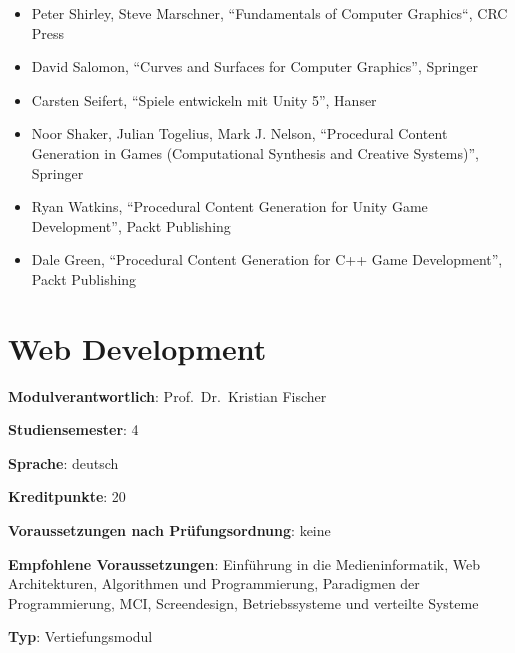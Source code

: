 \begin{itemize}
\tightlist
\item
  Peter Shirley, Steve Marschner, ``Fundamentals of Computer Graphics``,
  CRC Press
\item
  David Salomon, ``Curves and Surfaces for Computer Graphics'', Springer
\item
  Carsten Seifert, ``Spiele entwickeln mit Unity 5'', Hanser
\item
  Noor Shaker, Julian Togelius, Mark J. Nelson, ``Procedural Content
  Generation in Games (Computational Synthesis and Creative Systems)'',
  Springer
\item
  Ryan Watkins, ``Procedural Content Generation for Unity Game
  Development'', Packt Publishing
\item
  Dale Green, ``Procedural Content Generation for C++ Game
  Development'', Packt Publishing
\end{itemize}

\chapter{Web
Development\label{/mi-2017/modulbeschreibungen-bachelor/BA_Vertiefung-Web_Development}}\label{web-developmentpathlabelmi-2017modulbeschreibungen-bachelorbaux5fvertiefung-webux5fdevelopment}

\begin{modulHead}
\textbf{Modulverantwortlich}: Prof.~Dr.~Kristian
Fischer
\end{modulHead}
\begin{modulHead}
\textbf{Studiensemester}:
4
\end{modulHead}
\begin{modulHead}
\textbf{Sprache}:
deutsch
\end{modulHead}
\begin{modulHead}
\textbf{Kreditpunkte}:
20
\end{modulHead}
\begin{modulHead}
\textbf{Voraussetzungen nach
Prüfungsordnung}:
keine
\end{modulHead}
\begin{modulHead}
\textbf{Empfohlene
Voraussetzungen}: Einführung in die Medieninformatik, Web Architekturen,
Algorithmen und Programmierung, Paradigmen der Programmierung, MCI,
Screendesign, Betriebssysteme und verteilte
Systeme
\end{modulHead}
\begin{modulHead}
\textbf{Typ}:
Vertiefungsmodul
\end{modulHead}


